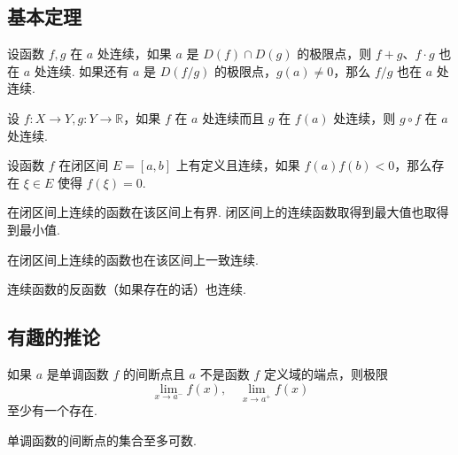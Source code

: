 \subsection{基本定理}
\begin{theorem}
    设函数 $f,g$ 在 $a$ 处连续，如果 $a$ 是 $D(f) \cap D(g)$ 的极限点，则 $f+g$、$f \cdot g$ 也在 $a$ 处连续. 如果还有 $a$ 是 $D(f/g)$ 的极限点，$g(a) \neq 0$，那么 $f/g$ 也在 $a$ 处连续.
\end{theorem}\vspace{9pt}

\begin{theorem}
    设 $f:X \rightarrow Y, g:Y \rightarrow \mathbb{R}$，如果 $f$ 在 $a$ 处连续而且 $g$ 在 $f(a)$ 处连续，则 $g \circ f$ 在 $a$ 处连续.
\end{theorem}\vspace{9pt}

\begin{theorem}
    设函数 $f$ 在闭区间 $E = [a,b]$ 上有定义且连续，如果 $f(a)f(b) < 0$，那么存在 $\xi \in E$ 使得 $f(\xi) = 0$.
\end{theorem}\vspace{9pt}

\begin{theorem}
    在闭区间上连续的函数在该区间上有界. 闭区间上的连续函数取得到最大值也取得到最小值.
\end{theorem}\vspace{9pt}

\begin{theorem}
    在闭区间上连续的函数也在该区间上一致连续.
\end{theorem}\vspace{9pt}

\begin{theorem}
    连续函数的反函数（如果存在的话）也连续.
\end{theorem}

\subsection{有趣的推论}
\begin{theorem}
    如果 $a$ 是单调函数 $f$ 的间断点且 $a$ 不是函数 $f$ 定义域的端点，则极限
    \[\lim_{x \rightarrow a^-}f(x), \quad \lim_{x \rightarrow a^+}f(x)\]
    至少有一个存在.
\end{theorem}\vspace{9pt}

\begin{theorem}
    单调函数的间断点的集合至多可数.
\end{theorem}